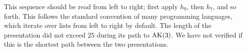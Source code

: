 This sequence should be read from left to right; first apply $h_9$, then $h_7$, and so forth. This follows the standard convention of many programming languages, which iterate over lists from left to right by default. The length of the presentation did not exceed $25$ during its path to $\text{AK}(3)$. We have not verified if this is the shortest path between the two presentations.


